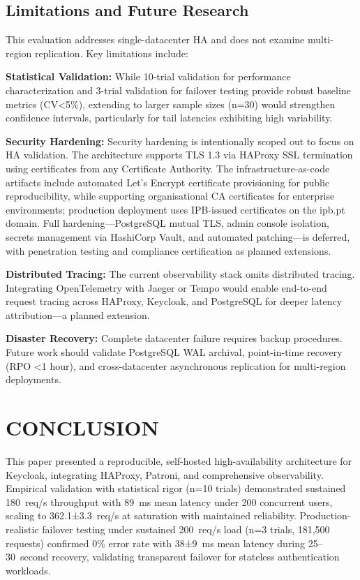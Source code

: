\documentclass[a4paper,twoside]{article}
\begin{document}
\subsection{Limitations and Future Research}

This evaluation addresses single-datacenter HA and does not examine multi-region replication. Key limitations include:

\textbf{Statistical Validation:} While 10-trial validation for performance characterization and 3-trial validation for failover testing provide robust baseline metrics (CV\textless5\%), extending to larger sample sizes (n=30) would strengthen confidence intervals, particularly for tail latencies exhibiting high variability.

\textbf{Security Hardening:} Security hardening is intentionally scoped out to focus on HA validation. The architecture supports TLS 1.3 via HAProxy SSL termination using certificates from any Certificate Authority. The infrastructure-as-code artifacts include automated Let's Encrypt certificate provisioning for public reproducibility, while supporting organisational CA certificates for enterprise environments; production deployment uses IPB-issued certificates on the ipb.pt domain. Full hardening---PostgreSQL mutual TLS, admin console isolation, secrets management via HashiCorp Vault, and automated patching---is deferred, with penetration testing and compliance certification as planned extensions.

\textbf{Distributed Tracing:} The current observability stack omits distributed tracing. Integrating OpenTelemetry with Jaeger or Tempo would enable end-to-end request tracing across HAProxy, Keycloak, and PostgreSQL for deeper latency attribution---a planned extension.

\textbf{Disaster Recovery:} Complete datacenter failure requires backup procedures. Future work should validate PostgreSQL WAL archival, point-in-time recovery (RPO \textless1 hour), and cross-datacenter asynchronous replication for multi-region deployments.

\section{\uppercase{Conclusion}}
\label{sec:conclusion}

This paper presented a reproducible, self-hosted high-availability architecture for Keycloak, integrating HAProxy, Patroni, and comprehensive observability. Empirical validation with statistical rigor (n=10 trials) demonstrated sustained 180~req/s throughput with 89~ms mean latency under 200 concurrent users, scaling to 362.1±3.3~req/s at saturation with maintained reliability. Production-realistic failover testing under sustained 200~req/s load (n=3 trials, 181,500 requests) confirmed 0\% error rate with 38±9~ms mean latency during 25--30~second recovery, validating transparent failover for stateless authentication workloads.
\end{document}
